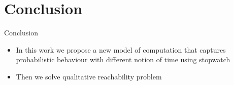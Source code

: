 \documentclass{beamer}
\begin{document}
     \section{Conclusion}
     \begin{frame}{Conclusion}
     \begin{itemize}
      \item In this work we propose a new model of computation that captures probabilistic behaviour with different notion of time using stopwatch
      \item Then we solve qualitative reachability problem
      \end{itemize}
     \end{frame}
\end{document}
